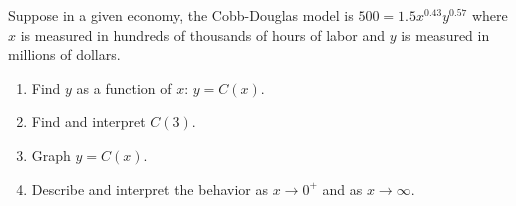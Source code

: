 \begin{ex} \label{CobbDouglasEx}  Suppose in a given economy, the Cobb-Douglas model is $500 = 1.5 x^{0.43} y^{0.57}$ where $x$ is measured in hundreds of thousands of hours of labor and $y$ is measured in millions of dollars.

\begin{enumerate}

\item  Find $y$ as a function of $x$:  $y = C(x)$.  

\item  Find and interpret $C(3)$.

\item Graph $y = C(x)$.  

\item Describe and interpret the behavior as $x \rightarrow 0^{+}$ and as $x \rightarrow \infty$.

\end{enumerate}


\end{ex}





\closegraphsfile